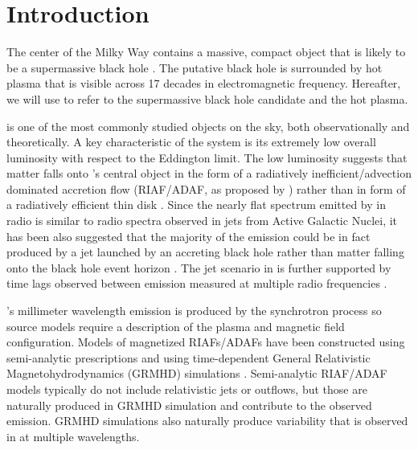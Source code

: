 \section{Introduction}
\label{sec:intro}

The center of the Milky Way contains a massive, compact object that is likely to be a supermassive black hole \citep{2019Sci...365..664D, 2019A&A...625L..10G}.
The putative black hole is surrounded by hot plasma that is visible across 17 decades in electromagnetic frequency.
Hereafter, we will use \sgra to refer to the supermassive black hole candidate and the hot plasma.

\sgra is one of the most commonly studied objects on the sky, both observationally and theoretically.  A key  characteristic of the \sgra system is its extremely low overall luminosity with respect to the Eddington limit.
The low luminosity suggests that matter falls onto \sgra's central object in the form of a radiatively inefficient/advection dominated accretion flow (RIAF/ADAF, as proposed by \citealt{1977ApJ...214..840I,1994ApJ...428L..13N, 1995ApJ...444..231N, 1995ApJ...452..710N, 1996A&AS..120C.287N, 1998ApJ...492..554N,2014ARA&A..52..529Y}) rather than in form of a radiatively efficient thin disk \citep{1973A&A....24..337S}.
Since the nearly flat spectrum emitted by \sgra in radio is similar to radio spectra observed in jets from Active Galactic Nuclei, it has been also suggested that the majority of the \sgra emission could be in fact produced by a jet launched by an accreting black hole rather than matter falling onto the black hole event horizon \citep{1993A&A...278L...1F, 2000A&A...362..113F}.
The jet scenario in \sgra is further supported by time lags observed between emission measured at multiple radio frequencies \citep{2021arXiv210713402B}.

\sgra's millimeter wavelength emission is produced by the  synchrotron process so source models require a description of the plasma and magnetic field configuration.  Models of magnetized RIAFs/ADAFs have been constructed using semi-analytic prescriptions \citep[e.g.,][]{1995Natur.374..623N,2000ApJ...541..234O, 2009ApJ...697...45B,2011ApJ...735..110B} and using time-dependent General Relativistic Magnetohydrodynamics (GRMHD) simulations \citep[e.g.,][]{2000ApJ...528..462H, 2003ApJ...589..458D, 2003ApJ...589..444G, 2007CQGra..24S.235G, 2012ApJS..201....9F, 2014ApJ...796...22F, 2016ApJS..225...22W, 2017ApJS..231...17A, 2018JPhCS1031a2008O, 2019A&A...629A..61O, 2019ApJS..243...26P}.
Semi-analytic RIAF/ADAF models typically do not include relativistic jets or outflows, but those are naturally produced in GRMHD simulation and contribute to the observed emission. GRMHD simulations also naturally produce variability that is observed in \sgra at multiple wavelengths.

